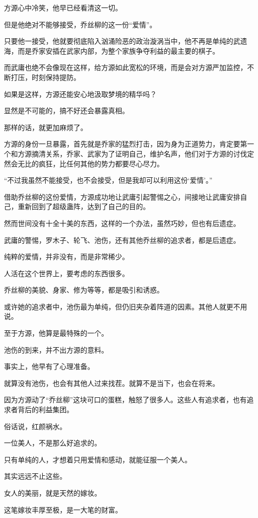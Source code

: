 \begin{this_body}
方源心中冷笑，他早已经看清这一切。

但是他绝对不能够接受，乔丝柳的这一份“爱情”。

只要他一接受，他就要彻底陷入汹涌险恶的政治漩涡当中，他不再是单纯的武遗海，而是乔家安插在武家内部，为整个家族争夺利益的最主要的棋子。

而武庸也绝不会像现在这样，给方源如此宽松的环境，而是会对方源严加监控，不断打压，时刻保持提防。

如果是这样，方源还能安心地汲取梦境的精华吗？

显然是不可能的，搞不好还会暴露真相。

那样的话，就更加麻烦了。

方源的身份一旦暴露，首先就是乔家的猛烈打击，因为身为正道势力，肯定要第一个和方源摘清关系，乔家、武家为了证明自己，维护名声，他们对于方源的讨伐定然会无比的疯狂，比任何其他的势力都要尽心尽力。

“不过我虽然不能接受，也不会接受，但是我却可以利用这份‘爱情’。”

借助乔丝柳的这份爱情，方源成功地让武庸引起警惕之心，间接地让武庸安排自己，重新回到了超级蛊阵，达到了自己的目的。

然而世间没有十全十美的东西，这样的一个办法，虽然巧妙，但也有后遗症。

武庸的警惕，罗木子、轮飞、池伤，还有其他乔丝柳的追求者，都是后遗症。

纯粹的爱情，并非没有，而是非常稀少。

人活在这个世界上，要考虑的东西很多。

乔丝柳的美貌、身家、修为等等，都是吸引和诱惑。

或许她的追求者中，池伤最为单纯，但仍旧夹杂着阵道的因素。其他人就更不用说。

至于方源，他算是最特殊的一个。

池伤的到来，并不出方源的意料。

事实上，他早有了心理准备。

就算没有池伤，也会有其他人过来找茬。就算不是当下，也会在将来。

因为方源动了“乔丝柳”这块可口的蛋糕，触怒了很多人。这些人有追求者，也有追求者背后的利益集团。

俗话说，红颜祸水。

一位美人，不是那么好追求的。

只有单纯的人，才想着只用爱情和感动，就能征服一个美人。

其实远远不止这些。

女人的美丽，就是天然的嫁妆。

这笔嫁妆丰厚至极，是一大笔的财富。


\end{this_body}
